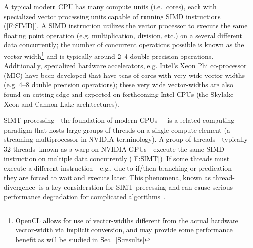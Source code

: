 \documentclass[12pt,number,sort&compress,preprint]{elsarticle}
\begin{document}
A typical modern CPU has many compute units (i.e., cores), each with specialized vector processing units capable of running SIMD instructions (\cref{F:SIMD}).
A SIMD instruction utilizes the vector processor to execute the same floating point operation (e.g. multiplication, division, etc.) on a several different data concurrently; the number of concurrent operations possible is known as the vector-width\footnote{OpenCL allows for use of vector-widths different from the actual hardware vector-width via implicit conversion, and may provide some performance benefit as will be studied in Sec.~\ref{S:results}} and is typically around 2--4 double precision operations. 
Additionally, specialized hardware accelerators, e.g. Intel's Xeon Phi co-processor (MIC) have been developed that have tens of cores with very wide vector-widths (e.g. 4--8 double precision operations); these very wide vector-widths are also found on cutting-edge and expected on forthcoming Intel CPUs (the Skylake Xeon and Cannon Lake architectures).

SIMT processing---the foundation of modern GPUs~\cite{lindholm2008nvidia}---is a related computing paradigm that hosts large groups of threads on a single compute element (a streaming multiprocessor in NVIDIA terminology).
A group of threads---typically \num{32} threads, known as a warp on NVIDIA GPUs---execute the same SIMD instruction on multiple data concurrently (\cref{F:SIMT}).
If some threads must execute a different instruction---e.g., due to if\slash then branching or predication---they are forced to wait and execute later.
This phenomena, known as thread-divergence, is a key consideration for SIMT-processing and can cause serious performance degradation for complicated algorithms~\cite{CurtisGPU:2017}.
\end{document}
